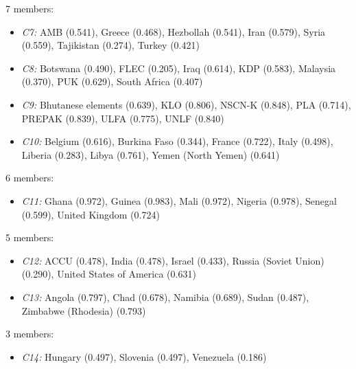 7 members:
\begin{itemize}[noitemsep, topsep=0pt]
    \item \textit{C7:} AMB (0.541), Greece (0.468), Hezbollah (0.541), Iran (0.579), Syria (0.559), Tajikistan (0.274), Turkey (0.421)
    \item \textit{C8:} Botswana (0.490), FLEC (0.205), Iraq (0.614), KDP (0.583), Malaysia (0.370), PUK (0.629), South Africa (0.407)
    \item \textit{C9:} Bhutanese elements (0.639), KLO (0.806), NSCN-K (0.848), PLA (0.714), PREPAK (0.839), ULFA (0.775), UNLF (0.840)
    \item \textit{C10:} Belgium (0.616), Burkina Faso (0.344), France (0.722), Italy (0.498), Liberia (0.283), Libya (0.761), Yemen (North Yemen) (0.641)
\end{itemize}
6 members:
\begin{itemize}[noitemsep, topsep=0pt]
    \item \textit{C11:} Ghana (0.972), Guinea (0.983), Mali (0.972), Nigeria (0.978), Senegal (0.599), United Kingdom (0.724)
\end{itemize}
5 members:
\begin{itemize}[noitemsep, topsep=0pt]
    \item \textit{C12:} ACCU (0.478), India (0.478), Israel (0.433), Russia (Soviet Union) (0.290), United States of America (0.631)
    \item \textit{C13:} Angola (0.797), Chad (0.678), Namibia (0.689), Sudan (0.487), Zimbabwe (Rhodesia) (0.793)
\end{itemize}
3 members:
\begin{itemize}[noitemsep, topsep=0pt]
    \item \textit{C14:} Hungary (0.497), Slovenia (0.497), Venezuela (0.186)
\end{itemize}

